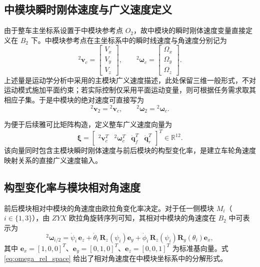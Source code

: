 \subsection{中模块瞬时刚体速度与广义速度定义}

由于整车主坐标系设置于中模块参考点 $O_2$，故中模块的瞬时刚体速度变量直接定义在 ${B_2}$ 下。中模块参考点在主坐标系中的瞬时线速度与角速度分别记为
\begin{equation}
{}^{2}\mathbf v_c=
\begin{bmatrix}
V_x\\
V_y\\
V_z
\end{bmatrix},
\qquad
{}^{2}\boldsymbol\omega_c=
\begin{bmatrix}
\Omega_x\\
\Omega_y\\
\Omega_z
\end{bmatrix}.
\end{equation}
上述量是运动学分析中采用的主模块广义速度描述，此处保留三维一般形式，不对运动模式施加平面约束；若实际控制仅采用平面运动变量，则可根据任务需求取其相应子集。于是中模块的绝对速度可直接写为
\begin{equation}
{}^{2}\mathbf v_2={}^2\mathbf v_c,
\qquad
{}^{2}\boldsymbol\omega_2={}^2\boldsymbol\omega_c.
\label{eq:middle_twist}
\end{equation}

为便于后续雅可比矩阵构造，定义整车广义速度向量为
\begin{equation}
\boldsymbol\xi=
\begin{bmatrix}
{}^{2}\mathbf v_c^T &
{}^{2}\boldsymbol\omega_c^T &
\dot{\mathbf q}_f^T &
\dot{\mathbf q}_r^T
\end{bmatrix}^{T}
\in \mathbb{R}^{12}.
\end{equation}
该向量同时包含主模块瞬时刚体速度与前后模块的构型变化率，是建立车轮角速度映射关系的直接广义速度输入。

\subsection{构型变化率与模块相对角速度}

前后模块相对中模块的角速度由欧拉角变化率决定。对于任一侧模块 $M_i$（$i\in\{1,3\}$），由 $ZYX$ 欧拉角旋转序列可知，其相对中模块的角速度在 ${B_2}$ 中可表示为
\begin{equation}
{}^{2}\boldsymbol\omega_{i/2}
=
\dot\psi_i\,\mathbf e_z
+
\dot\theta_i\,\mathbf R_z(\psi_i)\mathbf e_y
+
\dot\phi_i\,\mathbf R_z(\psi_i)\mathbf R_y(\theta_i)\mathbf e_x,
\label{eq:omega_rel_space}
\end{equation}
其中 $\mathbf e_x=[1,0,0]^T$、$\mathbf e_y=[0,1,0]^T$、$\mathbf e_z=[0,0,1]^T$ 为标准基向量。式 \eqref{eq:omega_rel_space} 给出了相对角速度在中模块坐标系中的分解形式。


